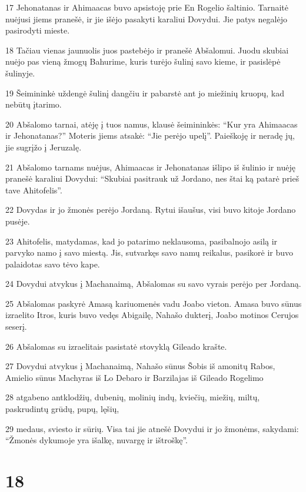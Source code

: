 \par 17 Jehonatanas ir Ahimaacas buvo apsistoję prie En Rogelio šaltinio. Tarnaitė nuėjusi jiems pranešė, ir jie išėjo pasakyti karaliui Dovydui. Jie patys negalėjo pasirodyti mieste. 
\par 18 Tačiau vienas jaunuolis juos pastebėjo ir pranešė Abšalomui. Juodu skubiai nuėjo pas vieną žmogų Bahurime, kuris turėjo šulinį savo kieme, ir pasislėpė šulinyje. 
\par 19 Šeimininkė uždengė šulinį dangčiu ir pabarstė ant jo miežinių kruopų, kad nebūtų įtarimo. 
\par 20 Abšalomo tarnai, atėję į tuos namus, klausė šeimininkės: “Kur yra Ahimaacas ir Jehonatanas?” Moteris jiems atsakė: “Jie perėjo upelį”. Paieškoję ir neradę jų, jie sugrįžo į Jeruzalę. 
\par 21 Abšalomo tarnams nuėjus, Ahimaacas ir Jehonatanas išlipo iš šulinio ir nuėję pranešė karaliui Dovydui: “Skubiai pasitrauk už Jordano, nes štai ką patarė prieš tave Ahitofelis”. 
\par 22 Dovydas ir jo žmonės perėjo Jordaną. Rytui išaušus, visi buvo kitoje Jordano pusėje. 
\par 23 Ahitofelis, matydamas, kad jo patarimo neklausoma, pasibalnojo asilą ir parvyko namo į savo miestą. Jis, sutvarkęs savo namų reikalus, pasikorė ir buvo palaidotas savo tėvo kape. 
\par 24 Dovydui atvykus į Machanaimą, Abšalomas su savo vyrais perėjo per Jordaną. 
\par 25 Abšalomas paskyrė Amasą kariuomenės vadu Joabo vieton. Amasa buvo sūnus izraelito Itros, kuris buvo vedęs Abigailę, Nahašo dukterį, Joabo motinos Cerujos seserį. 
\par 26 Abšalomas su izraelitais pasistatė stovyklą Gileado krašte. 
\par 27 Dovydui atvykus į Machanaimą, Nahašo sūnus Šobis iš amonitų Rabos, Amielio sūnus Machyras iš Lo Debaro ir Barzilajas iš Gileado Rogelimo 
\par 28 atgabeno antklodžių, dubenių, molinių indų, kviečių, miežių, miltų, paskrudintų grūdų, pupų, lęšių, 
\par 29 medaus, sviesto ir sūrių. Visa tai jie atnešė Dovydui ir jo žmonėms, sakydami: “Žmonės dykumoje yra išalkę, nuvargę ir ištroškę”.



\chapter{18}

